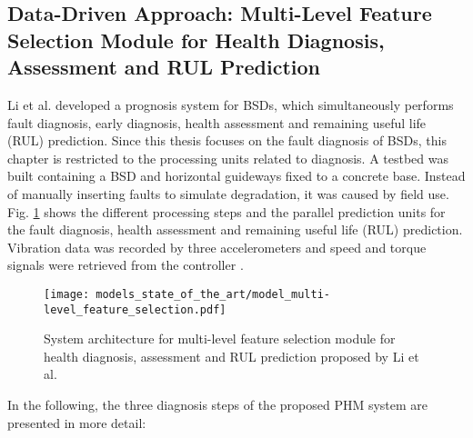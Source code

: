 \subsection{Data-Driven Approach: Multi-Level Feature Selection Module for Health Diagnosis, Assessment and RUL Prediction}
Li et al. \cite{LiPin2018} developed a prognosis system for BSDs, which simultaneously performs fault diagnosis, early diagnosis, health assessment and remaining useful life (RUL) prediction. Since this thesis focuses on the fault diagnosis of BSDs, this chapter is restricted to the processing units related to diagnosis. A testbed was built containing a BSD and horizontal guideways fixed to a concrete base. Instead of manually inserting faults to simulate degradation, it was caused by field use. Fig.  \ref{fig:level_feature_selection_model} shows the different processing steps and the parallel prediction units for the fault diagnosis, health assessment and remaining useful life (RUL) prediction. Vibration data was recorded by three accelerometers and speed and torque signals were retrieved from the controller \cite{LiPin2018}. 

\begin{figure}[H]
  \centering
  \texttt{[image: models\_state\_of\_the\_art/model\_multi-level\_feature\_selection.pdf]}
  \caption{System architecture for multi-level feature selection module for health diagnosis, assessment and RUL prediction proposed by Li et al. \cite{LiPin2018}}
  \label{fig:level_feature_selection_model}
\end{figure}

In the following, the three diagnosis steps of the proposed PHM system are presented in more detail:

